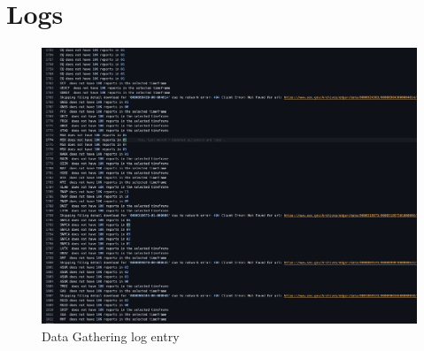 \documentclass[12pt,MSc,a4paper,oneside]{muthesis}
\begin{document}
\chapter{Logs}
\label{appendix:12}
\begin{figure}[h]
    \centering
    \includegraphics[scale=0.3]{results/data_gathering_log.png}
    \caption{Data Gathering log entry }
\end{figure}
\end{document}
